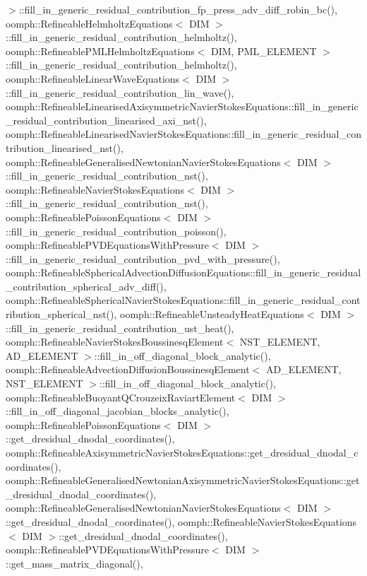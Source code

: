 $>$\+::fill\+\_\+in\+\_\+generic\+\_\+residual\+\_\+contribution\+\_\+fp\+\_\+press\+\_\+adv\+\_\+diff\+\_\+robin\+\_\+bc(), oomph\+::\+Refineable\+Helmholtz\+Equations$<$ D\+I\+M $>$\+::fill\+\_\+in\+\_\+generic\+\_\+residual\+\_\+contribution\+\_\+helmholtz(), oomph\+::\+Refineable\+P\+M\+L\+Helmholtz\+Equations$<$ D\+I\+M, P\+M\+L\+\_\+\+E\+L\+E\+M\+E\+N\+T $>$\+::fill\+\_\+in\+\_\+generic\+\_\+residual\+\_\+contribution\+\_\+helmholtz(), oomph\+::\+Refineable\+Linear\+Wave\+Equations$<$ D\+I\+M $>$\+::fill\+\_\+in\+\_\+generic\+\_\+residual\+\_\+contribution\+\_\+lin\+\_\+wave(), oomph\+::\+Refineable\+Linearised\+Axisymmetric\+Navier\+Stokes\+Equations\+::fill\+\_\+in\+\_\+generic\+\_\+residual\+\_\+contribution\+\_\+linearised\+\_\+axi\+\_\+nst(), oomph\+::\+Refineable\+Linearised\+Navier\+Stokes\+Equations\+::fill\+\_\+in\+\_\+generic\+\_\+residual\+\_\+contribution\+\_\+linearised\+\_\+nst(), oomph\+::\+Refineable\+Generalised\+Newtonian\+Navier\+Stokes\+Equations$<$ D\+I\+M $>$\+::fill\+\_\+in\+\_\+generic\+\_\+residual\+\_\+contribution\+\_\+nst(), oomph\+::\+Refineable\+Navier\+Stokes\+Equations$<$ D\+I\+M $>$\+::fill\+\_\+in\+\_\+generic\+\_\+residual\+\_\+contribution\+\_\+nst(), oomph\+::\+Refineable\+Poisson\+Equations$<$ D\+I\+M $>$\+::fill\+\_\+in\+\_\+generic\+\_\+residual\+\_\+contribution\+\_\+poisson(), oomph\+::\+Refineable\+P\+V\+D\+Equations\+With\+Pressure$<$ D\+I\+M $>$\+::fill\+\_\+in\+\_\+generic\+\_\+residual\+\_\+contribution\+\_\+pvd\+\_\+with\+\_\+pressure(), oomph\+::\+Refineable\+Spherical\+Advection\+Diffusion\+Equations\+::fill\+\_\+in\+\_\+generic\+\_\+residual\+\_\+contribution\+\_\+spherical\+\_\+adv\+\_\+diff(), oomph\+::\+Refineable\+Spherical\+Navier\+Stokes\+Equations\+::fill\+\_\+in\+\_\+generic\+\_\+residual\+\_\+contribution\+\_\+spherical\+\_\+nst(), oomph\+::\+Refineable\+Unsteady\+Heat\+Equations$<$ D\+I\+M $>$\+::fill\+\_\+in\+\_\+generic\+\_\+residual\+\_\+contribution\+\_\+ust\+\_\+heat(), oomph\+::\+Refineable\+Navier\+Stokes\+Boussinesq\+Element$<$ N\+S\+T\+\_\+\+E\+L\+E\+M\+E\+N\+T, A\+D\+\_\+\+E\+L\+E\+M\+E\+N\+T $>$\+::fill\+\_\+in\+\_\+off\+\_\+diagonal\+\_\+block\+\_\+analytic(), oomph\+::\+Refineable\+Advection\+Diffusion\+Boussinesq\+Element$<$ A\+D\+\_\+\+E\+L\+E\+M\+E\+N\+T, N\+S\+T\+\_\+\+E\+L\+E\+M\+E\+N\+T $>$\+::fill\+\_\+in\+\_\+off\+\_\+diagonal\+\_\+block\+\_\+analytic(), oomph\+::\+Refineable\+Buoyant\+Q\+Crouzeix\+Raviart\+Element$<$ D\+I\+M $>$\+::fill\+\_\+in\+\_\+off\+\_\+diagonal\+\_\+jacobian\+\_\+blocks\+\_\+analytic(), oomph\+::\+Refineable\+Poisson\+Equations$<$ D\+I\+M $>$\+::get\+\_\+dresidual\+\_\+dnodal\+\_\+coordinates(), oomph\+::\+Refineable\+Axisymmetric\+Navier\+Stokes\+Equations\+::get\+\_\+dresidual\+\_\+dnodal\+\_\+coordinates(), oomph\+::\+Refineable\+Generalised\+Newtonian\+Axisymmetric\+Navier\+Stokes\+Equations\+::get\+\_\+dresidual\+\_\+dnodal\+\_\+coordinates(), oomph\+::\+Refineable\+Generalised\+Newtonian\+Navier\+Stokes\+Equations$<$ D\+I\+M $>$\+::get\+\_\+dresidual\+\_\+dnodal\+\_\+coordinates(), oomph\+::\+Refineable\+Navier\+Stokes\+Equations$<$ D\+I\+M $>$\+::get\+\_\+dresidual\+\_\+dnodal\+\_\+coordinates(), oomph\+::\+Refineable\+P\+V\+D\+Equations\+With\+Pressure$<$ D\+I\+M $>$\+::get\+\_\+mass\+\_\+matrix\+\_\+diagonal(), 